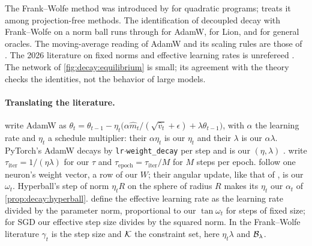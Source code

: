 \begin{refsection}
The Frank--Wolfe method was introduced by \textcite{FrankWolfe1956} for quadratic programs; \textcite{Hazan2016} treats it among projection-free methods. The identification of decoupled decay with Frank--Wolfe on a norm ball runs through \textcite{XieLi2024} for AdamW, \textcite{ChenEtAl2024Lion} for Lion, and \textcite{PethickEtAl2025} for general oracles. The moving-average reading of AdamW and its scaling rules are those of \textcite{WangAitchison2025}. The 2026 literature on fixed norms and effective learning rates is unrefereed \parencite{WenEtAl2026Hyperball,LiuEtAl2026ELR,XiaoEtAl2026,YuanEtAl2026}. The network of \cref{fig:decay:equilibrium} is small; its agreement with the theory checks the identities, not the behavior of large models.

\paragraph{Translating the literature.} \Textcite{LoshchilovHutter2019} write AdamW as $\theta_t=\theta_{t-1}-\eta_t\bigl(\alpha\hat m_t/(\sqrt{\hat v_t}+\epsilon)+\lambda\theta_{t-1}\bigr)$, with $\alpha$ the learning rate and $\eta_t$ a schedule multiplier: their $\alpha\eta_t$ is our $\eta_t$ and their $\lambda$ is our $\alpha\lambda$. PyTorch's AdamW decays by \texttt{lr}$\cdot$\texttt{weight\_decay} per step and is our $(\eta,\lambda)$ \parencite{Schaipp2024}. \Textcite{WangAitchison2025} write $\tau_{\mathrm{iter}}=1/(\eta\lambda)$ for our $\tau$ and $\tau_{\mathrm{epoch}}=\tau_{\mathrm{iter}}/M$ for $M$ steps per epoch. \Textcite{KossonMessmerJaggi2024} follow one neuron's weight vector, a row of our $W$; their angular update, like that of \textcite{WanEtAl2021}, is our $\omega_t$. Hyperball's step of norm $\eta_tR$ on the sphere of radius $R$ makes its $\eta_t$ our $\alpha_t$ of \cref{prop:decay:hyperball}. \Textcite{LiuEtAl2026ELR} define the effective learning rate as the learning rate divided by the parameter norm, proportional to our $\tan\omega_t$ for steps of fixed size; for SGD our effective step size divides by the squared norm. In the Frank--Wolfe literature $\gamma_t$ is the step size and $\mathcal{K}$ the constraint set, here $\eta_t\lambda$ and $\mathcal{B}_\lambda$.

\printchapterbib
\end{refsection}
